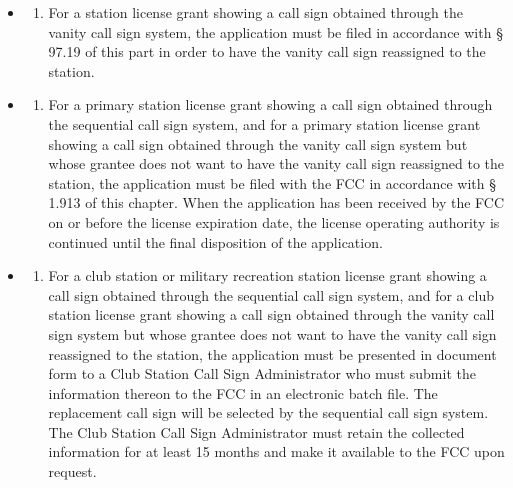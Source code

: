 \documentclass[
  letterpaper,
  DIV=11,
  numbers=noendperiod]{scrreport}
\providecommand{\tightlist}{%
  \setlength{\itemsep}{0pt}\setlength{\parskip}{0pt}}\usepackage{longtable,booktabs,array}
\begin{document}
\begin{itemize}
  \begin{itemize}
  \item
    \begin{enumerate}
    \def\labelenumi{(\roman{enumi})}
    \tightlist
    \item
      For a station license grant showing a call sign obtained through
      the vanity call sign system, the application must be filed in
      accordance with § 97.19 of this part in order to have the vanity
      call sign reassigned to the station.
    \end{enumerate}
  \item
    \begin{enumerate}
    \def\labelenumi{(\roman{enumi})}
    \setcounter{enumi}{1}
    \tightlist
    \item
      For a primary station license grant showing a call sign obtained
      through the sequential call sign system, and for a primary station
      license grant showing a call sign obtained through the vanity call
      sign system but whose grantee does not want to have the vanity
      call sign reassigned to the station, the application must be filed
      with the FCC in accordance with § 1.913 of this chapter. When the
      application has been received by the FCC on or before the license
      expiration date, the license operating authority is continued
      until the final disposition of the application.
    \end{enumerate}
  \item
    \begin{enumerate}
    \def\labelenumi{(\roman{enumi})}
    \setcounter{enumi}{2}
    \tightlist
    \item
      For a club station or military recreation station license grant
      showing a call sign obtained through the sequential call sign
      system, and for a club station license grant showing a call sign
      obtained through the vanity call sign system but whose grantee
      does not want to have the vanity call sign reassigned to the
      station, the application must be presented in document form to a
      Club Station Call Sign Administrator who must submit the
      information thereon to the FCC in an electronic batch file. The
      replacement call sign will be selected by the sequential call sign
      system. The Club Station Call Sign Administrator must retain the
      collected information for at least 15 months and make it available
      to the FCC upon request.
    \end{enumerate}
  \end{itemize}
\end{itemize}
\end{document}
